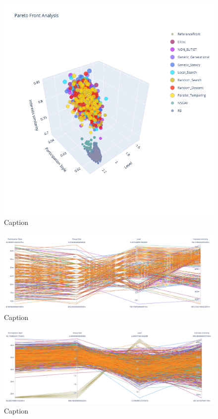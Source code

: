 \begin{figure}
    \centering
    \includegraphics[width=\textwidth]{images/3d_front_mixed_200_moa_alt.png}
    \caption{Caption}
    \label{fig:my_label}
\end{figure}


\begin{figure}
    \centering
    \includegraphics[width=\textwidth]{images/para_front_mixed_20_soa.png}
    \caption{Caption}
    \label{fig:my_label}
\end{figure}

\begin{figure}
    \centering
    \includegraphics[width=\textwidth]{images/para_front_mixed_200_soa.png}
    \caption{Caption}
    \label{fig:my_label}
\end{figure}

